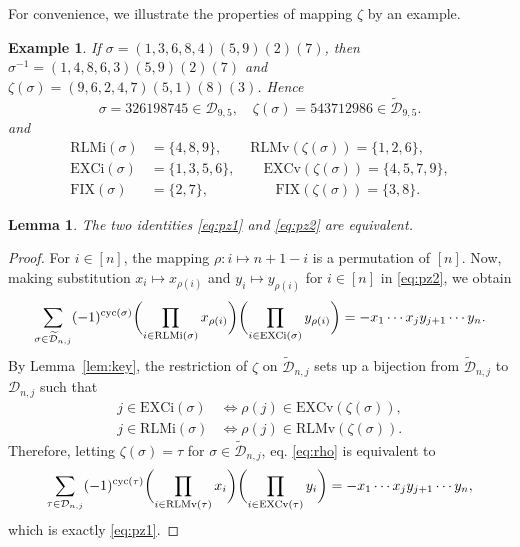 \documentclass[12pt,reqno]{amsart}
\numberwithin{equation}{section}
\newcommand\cyc{\mathop{ \rm cyc}}
\def\D{\mathcal{D}}
\def\cyc{\mathop{\rm cyc}}
\newtheorem{lem}{Lemma}
\newtheorem{example}{Example}
\begin{document}
For convenience,
we  illustrate the  properties of mapping $\zeta$ by an  example.
\begin{example}
If $\sigma=(1,3,6,8,4)(5,9)(2)(7)$, then
 $\sigma^{-1}=(1, 4,8, 6,3)(5,9)(2)(7)$ and 
 $\zeta(\sigma)=(9,6, 2,4, 7)(5,1)(8)(3)$. Hence
 $$
 \sigma=326198745\in  \D_{9,5},\quad \zeta(\sigma)=543712986\in \widetilde{\D}_{9,5}.
 $$
 and 
 \begin{align*}
\mathrm{RLMi}(\sigma)&=\{4,8,9\},\qquad 
\mathrm{RLMv}(\zeta(\sigma))=\{1,2,6\},\\
\mathrm{EXCi}(\sigma)&=\{1,3,5,6\},\qquad 
\mathrm{EXCv}(\zeta(\sigma))=\{4,5,7,9\},\\
\mathrm{FIX}(\sigma)&=\{2,7\},\hspace{2cm}
  \mathrm{FIX}(\zeta(\sigma))=\{3,8\}. 
  \end{align*}
\end{example}

\begin{lem}\label{lem:equivalence}
The two identities \eqref{eq:pz1} and \eqref{eq:pz2} are equivalent.
\end{lem}
\begin{proof}
For $i\in [n]$, the mapping 
$\rho: i\mapsto n+1-i$ is a permutation of $[n]$. 
Now, making substitution 
$x_i\mapsto x_{\rho(i)}$ and $y_i\mapsto y_{\rho(i)}$ for $i\in [n]$ in \eqref{eq:pz2}, we obtain
\begin{align}\label{eq:rho}
\sum_{\sigma\in \widetilde{\D}_{n,j}}(-1)^{\cyc (\sigma)}
	\biggl( \prod_{i\in \mathrm{RLMi}(\sigma)}
	x_{\rho(i)} \biggr) 
	\biggl( \prod_{i\in \mathrm{EXCi}(\sigma)}y_{\rho(i)} \biggr)  =-x_1\cdots x_j y_{j+1}\cdots y_n.
\end{align}
By Lemma~\ref{lem:key},  the restriction of $\zeta$
on $\widetilde{\D}_{n,j}$ sets up a bijection from  
$\widetilde{\D}_{n,j}$ to $\D_{n,j}$ such that
\begin{align*}
j\in \mathrm{EXCi}(\sigma)&\Longleftrightarrow \rho(j)\in \mathrm{EXCv}(\zeta(\sigma)),\\
j\in \mathrm{RLMi}(\sigma)&\Longleftrightarrow \rho(j)\in \mathrm{RLMv}(\zeta(\sigma)).
\end{align*}
Therefore, letting  $\zeta(\sigma)=\tau$ for $\sigma\in \widetilde{\D}_{n,j}$,  eq.  \eqref{eq:rho} is equivalent to
$$
\sum_{\tau\in \D_{n,j}}(-1)^{\cyc (\tau)}
	\biggl( \prod_{i\in \mathrm{RLMv}(\tau)}
	x_{i} \biggr) 
	\biggl( \prod_{i\in \mathrm{EXCv}(\tau)}y_{i} \biggr)=-x_1\cdots x_j y_{j+1}\cdots y_n,
$$
which is exactly \eqref{eq:pz1}.
\end{proof}
\end{document}
